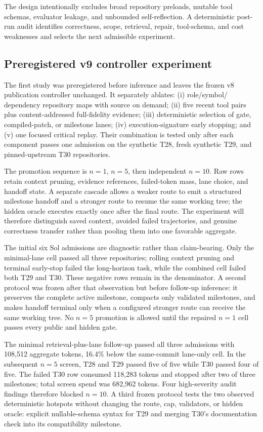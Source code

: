 \documentclass[10pt,twocolumn]{article}
\begin{document}
The design intentionally excludes broad repository preloads, mutable tool
schemas, evaluator leakage, and unbounded self-reflection. A deterministic
post-run audit identifies correctness, scope, retrieval, repair, tool-schema,
and cost weaknesses and selects the next admissible experiment.

\subsection{Preregistered v9 controller experiment}

The first study was preregistered before inference and leaves the frozen v8
publication controller unchanged. It separately ablates: (i) role/symbol/
dependency repository maps with source on demand; (ii) five recent tool pairs
plus content-addressed full-fidelity evidence; (iii) deterministic selection of
gate, compiled-patch, or milestone lanes; (iv) execution-signature early
stopping; and (v) one focused critical replay. Their combination is tested only
after each component passes one admission on the synthetic T28, fresh synthetic
T29, and pinned-upstream T30 repositories.

The promotion sequence is $n=1$, $n=5$, then independent $n=10$. Raw rows
retain context pruning, evidence references, failed-token mass, lane choice,
and handoff state. A separate cascade allows a weaker route to emit a structured
milestone handoff and a stronger route to resume the same working tree; the
hidden oracle executes exactly once after the final route. The experiment will
therefore distinguish saved context, avoided failed trajectories, and genuine
correctness transfer rather than pooling them into one favorable aggregate.

The initial six Sol admissions are diagnostic rather than claim-bearing. Only
the minimal-lane cell passed all three repositories; rolling context pruning
and terminal early-stop failed the long-horizon task, while the combined cell
failed both T29 and T30. These negative rows remain in the denominator. A
second protocol was frozen after that observation but before follow-up
inference: it preserves the complete active milestone, compacts only validated
milestones, and makes handoff terminal only when a configured stronger route
can receive the same working tree. No $n=5$ promotion is allowed until the
repaired $n=1$ cell passes every public and hidden gate.

The minimal retrieval-plus-lane follow-up passed all three admissions with
108,512 aggregate tokens, 16.4\% below the same-commit lane-only cell. In the
subsequent $n=5$ screen, T28 and T29 passed five of five while T30 passed four
of five. The failed T30 row consumed 118,283 tokens and stopped after two of
three milestones; total screen spend was 682,962 tokens. Four high-severity
audit findings therefore blocked $n=10$. A third frozen protocol tests the two
observed deterministic hotspots without changing the route, cap, validators,
or hidden oracle: explicit nullable-schema syntax for T29 and merging T30's
documentation check into its compatibility milestone.
\end{document}
